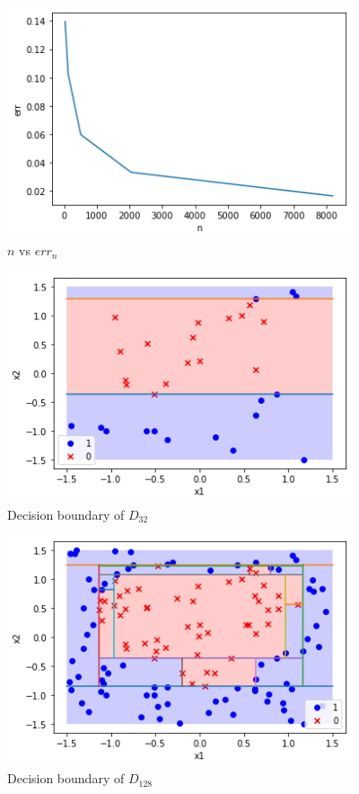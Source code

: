 \documentclass[a4paper]{article}
\theoremstyle{definition}
\begin{document}
\begin{figure}[htbp]
\centering
\includegraphics[width=4in]{Q7-6.png}
\caption{$n$ vs $err_{n}$}
\label{Q7-6}
\end{figure}

\begin{figure}[htbp]
\centering
\includegraphics[width=4in]{Q7-1.png}
\caption{Decision boundary of $D_{32}$}
\label{Q7-1}
\end{figure}

\begin{figure}[htbp]
\centering
\includegraphics[width=4in]{Q7-2.png}
\caption{Decision boundary of $D_{128}$}
\label{Q7-2}
\end{figure}
\end{document}
